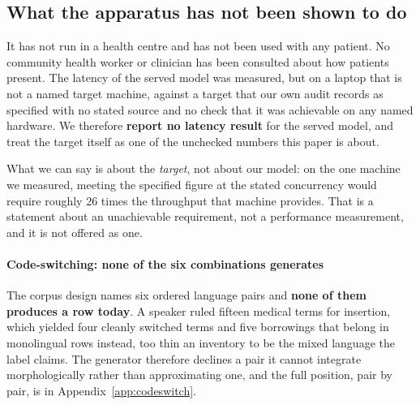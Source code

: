 \subsection{What the apparatus has not been shown to do}

It has not run in a health centre and has not been used with any patient. No
community health worker or clinician has been consulted about how patients
present. The latency of the served model was measured, but on a laptop that is
not a named target machine, against a target that our own audit records as
specified with no stated source and no check that it was achievable on any named
hardware. We therefore \textbf{report no latency result} for the served model,
and treat the target itself as one of the unchecked numbers this paper is about.

What we can say is about the \emph{target}, not about our model: on the one
machine we measured, meeting the specified figure at the stated concurrency
would require roughly 26 times the throughput that machine provides. That is a
statement about an unachievable requirement, not a performance measurement, and
it is not offered as one.

\paragraph{Code-switching: none of the six combinations generates}

The corpus design names six ordered language pairs and \textbf{none of them
produces a row today}. A speaker ruled fifteen medical terms for insertion, which
yielded four cleanly switched terms and five borrowings that belong in monolingual
rows instead, too thin an inventory to be the mixed language the label claims. The
generator therefore declines a pair it cannot integrate morphologically rather
than approximating one, and the full position, pair by pair, is in
Appendix~\ref{app:codeswitch}.
